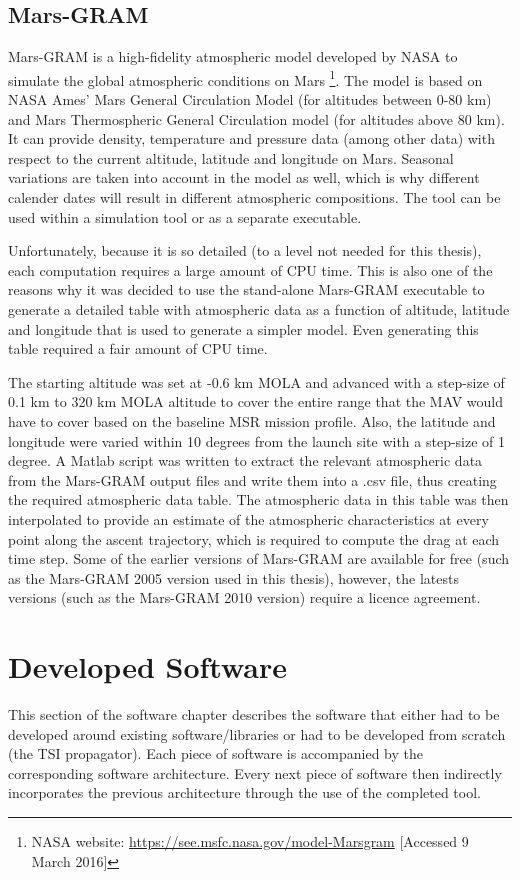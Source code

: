 \subsection{Mars-\ac{GRAM}}
\label{subsec:marsgram}
Mars-\ac{GRAM} is a high-fidelity atmospheric model developed by \ac{NASA} to simulate the global atmospheric conditions on Mars \citep{justus2008utilizing} \footnote{\ac{NASA} website: \url{https://see.msfc.nasa.gov/model-Marsgram} [Accessed 9 March 2016]}. The model is based on \ac{NASA} Ames' Mars General Circulation Model (for altitudes between 0-80 km) and Mars Thermospheric General Circulation model (for altitudes above 80 km). It can provide density, temperature and pressure data (among other data) with respect to the current altitude, latitude and longitude on Mars.  Seasonal variations are taken into account in the model as well, which is why different calender dates will result in different atmospheric compositions. The tool can be used within a simulation tool or as a separate executable. 

Unfortunately, because it is so detailed (to a level not needed for this thesis), each computation requires a large amount of CPU time. This is also one of the reasons why it was decided to use the stand-alone Mars-\ac{GRAM} executable to generate a detailed table with atmospheric data as a function of altitude, latitude and longitude that is used to generate a simpler model. Even generating this table required a fair amount of CPU time. 

The starting altitude was set at -0.6 km \ac{MOLA} and advanced with a step-size of 0.1 km to 320 km \ac{MOLA} altitude to cover the entire range that the \ac{MAV} would have to cover based on the baseline \ac{MSR} mission profile. Also, the latitude and longitude were varied within 10 degrees from the launch site with a step-size of 1 degree. A Matlab script was written to extract the relevant atmospheric data from the Mars-\ac{GRAM} output files and write them into a .csv file, thus creating the required atmospheric data table. The atmospheric data in this table was then interpolated to provide an estimate of the atmospheric characteristics at every point along the ascent trajectory, which is required to compute the drag at each time step. Some of the earlier versions of Mars-\ac{GRAM} are available for free (such as the Mars-\ac{GRAM} 2005 version used in this thesis), however, the latests versions (such as the Mars-\ac{GRAM} 2010 version) require a licence agreement.


\section{Developed Software}
\label{sec:developedsoftware}
This section of the software chapter describes the software that either had to be developed around existing software/libraries or had to be developed from scratch (the \ac{TSI} propagator). Each piece of software is accompanied by the corresponding software architecture. Every next piece of software then indirectly incorporates the previous architecture through the use of the completed tool.


